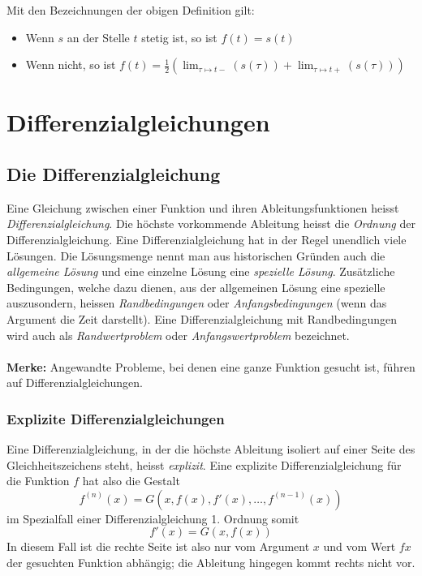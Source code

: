 \documentclass[10pt,a4paper]{scrartcl}
\begin{document}
Mit den Bezeichnungen der obigen Definition gilt:
\begin{itemize}
\item Wenn $s$ an der Stelle $t$ stetig ist, so ist $f(t) = s(t)$
\item Wenn nicht, so ist $\displaystyle f(t) = \frac{1}{2} \left(\lim_{\tau \mapsto t-}(s(\tau)) + \lim_{\tau \mapsto t+}(s(\tau))\right)$
\end{itemize}




\section{Differenzialgleichungen}

\subsection{Die Differenzialgleichung}

Eine Gleichung zwischen einer Funktion und ihren Ableitungsfunktionen heisst \textit{Differenzialgleichung}.
Die höchste vorkommende Ableitung heisst die \textit{Ordnung} der Differenzialgleichung. Eine
Differenzialgleichung hat in der Regel unendlich viele Lösungen. Die Lösungsmenge nennt man aus
historischen Gründen auch die \textit{allgemeine Lösung} und eine einzelne Lösung eine \textit{spezielle Lösung}.
Zusätzliche Bedingungen, welche dazu dienen, aus der allgemeinen Lösung eine spezielle auszusondern,
heissen \textit{Randbedingungen} oder \textit{Anfangsbedingungen} (wenn das Argument die Zeit darstellt).
Eine Differenzialgleichung mit Randbedingungen wird auch als \textit{Randwertproblem} oder \textit{Anfangswertproblem}
bezeichnet.\\\\
\textbf{Merke:} Angewandte Probleme, bei denen eine ganze Funktion gesucht ist, führen auf Differenzialgleichungen.


\subsubsection{Explizite Differenzialgleichungen}

Eine Differenzialgleichung, in der die höchste Ableitung isoliert auf einer Seite des
Gleichheitszeichens steht, heisst \textit{explizit}. Eine explizite Differenzialgleichung
für die Funktion $f$ hat also die Gestalt
$$f^{(n)}(x) = G\left(x,f(x),f'(x),\dots,f^{(n-1)}(x)\right)$$
im Spezialfall einer Differenzialgleichung 1. Ordnung somit
$$f'(x) = G(x,f(x))$$
In diesem Fall ist die rechte Seite ist also nur vom Argument $x$ und vom Wert $fx$ der
gesuchten Funktion abhängig; die Ableitung hingegen kommt rechts nicht vor.
\end{document}
